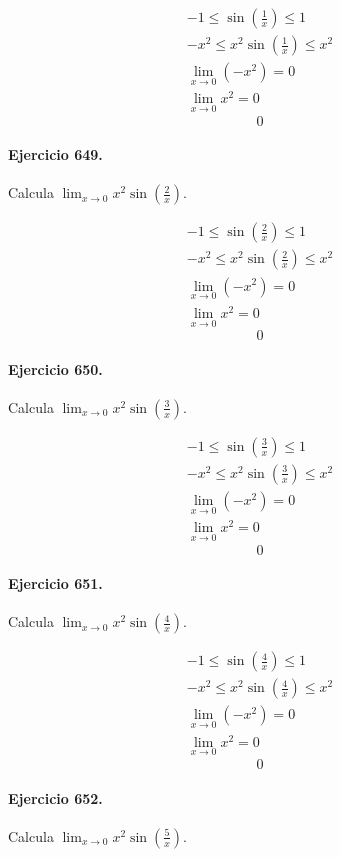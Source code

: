 \documentclass[11pt,a4paper]{article}
\begin{document}
\[
\begin{aligned}
-1\le\sin\left(\frac{1}{x}\right)\le1\\
-x^2\le x^2\sin\left(\frac{1}{x}\right)\le x^2\\
\lim_{x\to0}(-x^2)=0\\
\lim_{x\to0}x^2=0
\end{aligned}
\]
\[\boxed{0}\]


\paragraph{Ejercicio 649.} Calcula $\displaystyle\lim_{x\to0}x^2\sin\left(\frac{2}{x}\right)$.

\[
\begin{aligned}
-1\le\sin\left(\frac{2}{x}\right)\le1\\
-x^2\le x^2\sin\left(\frac{2}{x}\right)\le x^2\\
\lim_{x\to0}(-x^2)=0\\
\lim_{x\to0}x^2=0
\end{aligned}
\]
\[\boxed{0}\]


\paragraph{Ejercicio 650.} Calcula $\displaystyle\lim_{x\to0}x^2\sin\left(\frac{3}{x}\right)$.

\[
\begin{aligned}
-1\le\sin\left(\frac{3}{x}\right)\le1\\
-x^2\le x^2\sin\left(\frac{3}{x}\right)\le x^2\\
\lim_{x\to0}(-x^2)=0\\
\lim_{x\to0}x^2=0
\end{aligned}
\]
\[\boxed{0}\]


\paragraph{Ejercicio 651.} Calcula $\displaystyle\lim_{x\to0}x^2\sin\left(\frac{4}{x}\right)$.

\[
\begin{aligned}
-1\le\sin\left(\frac{4}{x}\right)\le1\\
-x^2\le x^2\sin\left(\frac{4}{x}\right)\le x^2\\
\lim_{x\to0}(-x^2)=0\\
\lim_{x\to0}x^2=0
\end{aligned}
\]
\[\boxed{0}\]


\paragraph{Ejercicio 652.} Calcula $\displaystyle\lim_{x\to0}x^2\sin\left(\frac{5}{x}\right)$.
\end{document}
